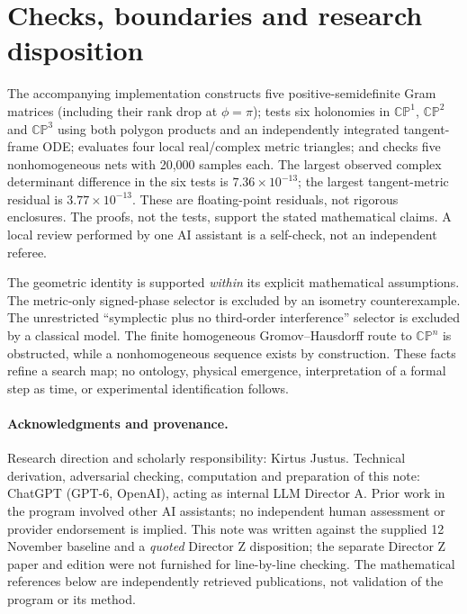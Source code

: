 \documentclass[11pt,a4paper]{article}
\newcommand{\CP}{\mathbb{CP}}
\begin{document}
\section{Checks, boundaries and research disposition}
The accompanying implementation constructs five positive-semidefinite Gram matrices (including their rank drop at \(\phi=\pi\)); tests six holonomies in \(\CP^1\), \(\CP^2\) and \(\CP^3\) using both polygon products and an independently integrated tangent-frame ODE; evaluates four local real/complex metric triangles; and checks five nonhomogeneous nets with 20,000 samples each. The largest observed complex determinant difference in the six tests is \(7.36\times10^{-13}\); the largest tangent-metric residual is \(3.77\times10^{-13}\). These are floating-point residuals, not rigorous enclosures. The proofs, not the tests, support the stated mathematical claims. A local review performed by one AI assistant is a self-check, not an independent referee.

The geometric identity is supported \emph{within} its explicit mathematical assumptions. The metric-only signed-phase selector is excluded by an isometry counterexample. The unrestricted ``symplectic plus no third-order interference'' selector is excluded by a classical model. The finite homogeneous Gromov--Hausdorff route to \(\CP^n\) is obstructed, while a nonhomogeneous sequence exists by construction. These facts refine a search map; no ontology, physical emergence, interpretation of a formal step as time, or experimental identification follows.

\paragraph{Acknowledgments and provenance.} Research direction and scholarly responsibility: Kirtus Justus. Technical derivation, adversarial checking, computation and preparation of this note: ChatGPT (GPT-6, OpenAI), acting as internal LLM Director A. Prior work in the program involved other AI assistants; no independent human assessment or provider endorsement is implied. This note was written against the supplied 12 November baseline and a \emph{quoted} Director Z disposition; the separate Director Z paper and edition were not furnished for line-by-line checking. The mathematical references below are independently retrieved publications, not validation of the program or its method.
\end{document}
